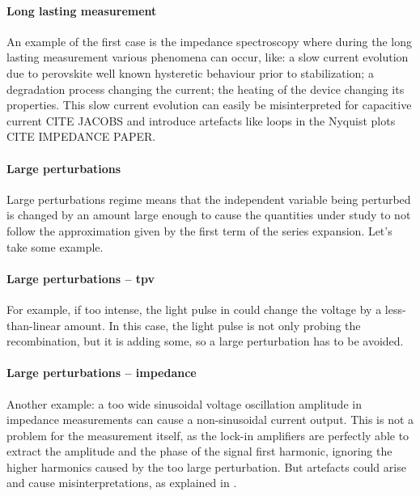 \paragraph{Long lasting measurement} An example of the first case is the impedance spectroscopy where during the long lasting measurement various phenomena can occur, like: a slow current evolution due to perovskite well known hysteretic behaviour prior to stabilization; a degradation process changing the current; the heating of the device changing its properties. This slow current evolution can easily be misinterpreted for capacitive current CITE JACOBS and introduce artefacts like loops in the Nyquist plots CITE IMPEDANCE PAPER.

\paragraph{Large perturbations} Large perturbations regime means that the independent variable being perturbed is changed by an amount large enough to cause the quantities under study to not follow the approximation given by the first term of the series expansion. Let's take some example.

\paragraph{Large perturbations -- \gls{tpv}} For example, if too intense, the light pulse in  could change the voltage by a less-than-linear amount. In this case, the light pulse is not only probing the recombination, but it is adding some, so a large perturbation has to be avoided.

\paragraph{Large perturbations -- impedance} Another example: a too wide sinusoidal voltage oscillation amplitude in impedance measurements can cause a non-sinusoidal current output. This is not a problem for the measurement itself, as the lock-in amplifiers are perfectly able to extract the amplitude and the phase of the signal first harmonic, ignoring the higher harmonics caused by the too large perturbation. But artefacts could arise and cause misinterpretations, as explained in .

